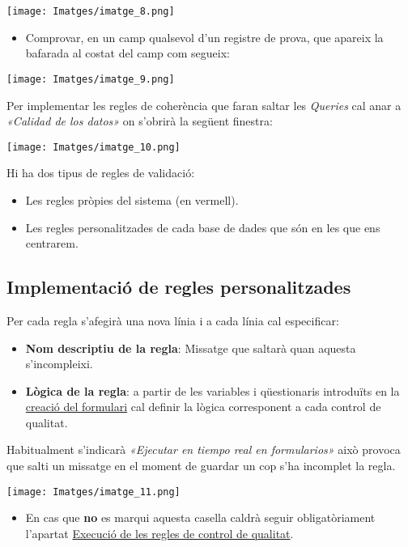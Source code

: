 \documentclass[
]{article}
\providecommand{\tightlist}{%
  \setlength{\itemsep}{0pt}\setlength{\parskip}{0pt}}
\begin{document}
\texttt{[image: Imatges/imatge\_8.png]}

\begin{itemize}
\tightlist
\item
  Comprovar, en un camp qualsevol d'un registre de prova, que apareix la bafarada al costat del camp com segueix:
\end{itemize}

\texttt{[image: Imatges/imatge\_9.png]}

Per implementar les regles de coherència que faran saltar les \emph{Queries} cal anar a \emph{«Calidad de los datos»} on s'obrirà la següent finestra:

\texttt{[image: Imatges/imatge\_10.png]}

Hi ha dos tipus de regles de validació:

\begin{itemize}
\tightlist
\item
  Les regles pròpies del sistema (en vermell).
\item
  Les regles personalitzades de cada base de dades que són en les que ens centrarem.
\end{itemize}

\hypertarget{en6}{%
\subsection{\texorpdfstring{\textbf{Implementació de regles personalitzades}}{Implementació de regles personalitzades}}\label{en6}}

Per cada regla s'afegirà una nova línia i a cada línia cal especificar:

\begin{itemize}
\tightlist
\item
  \textbf{Nom descriptiu de la regla}: Missatge que saltarà quan aquesta s'incompleixi.
\item
  \textbf{Lògica de la regla}: a partir de les variables i qüestionaris introduïts en la \protect\hyperlink{en4}{creació del formulari} cal definir la lògica corresponent a cada control de qualitat.
\end{itemize}

Habitualment s'indicarà \emph{«Ejecutar en tiempo real en formularios»} això provoca que salti un missatge en el moment de guardar un cop s'ha incomplet la regla.

\texttt{[image: Imatges/imatge\_11.png]}

\begin{itemize}
\tightlist
\item
  En cas que \textbf{no} es marqui aquesta casella caldrà seguir obligatòriament l'apartat \protect\hyperlink{en5}{Execució de les regles de control de qualitat}.
\end{itemize}
\end{document}

